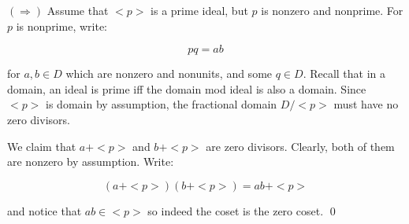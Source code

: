 \documentclass{article}
\begin{document}
$(\Rightarrow)$
Assume that $<p>$ is a prime ideal, but 
$p$ is nonzero and nonprime. For $p$ is 
nonprime, write:

\[
    pq = ab
\]

for $a, b\in D$ which are nonzero and nonunits, and some 
$q \in D$. Recall that in a domain, 
an ideal is prime iff the domain mod 
ideal is also a domain. Since $<p>$ is 
domain by assumption, the fractional 
domain $D/<p>$ must have no zero divisors. 

We claim that $a + <p>$ and $b+<p>$ are 
zero divisors. Clearly, both of them are 
nonzero by assumption. Write:

\[(a+<p>)(b+<p>) = ab+<p>\]

and notice that $ab\in <p>$ so indeed 
the coset is the zero coset. \qed
\end{document}
